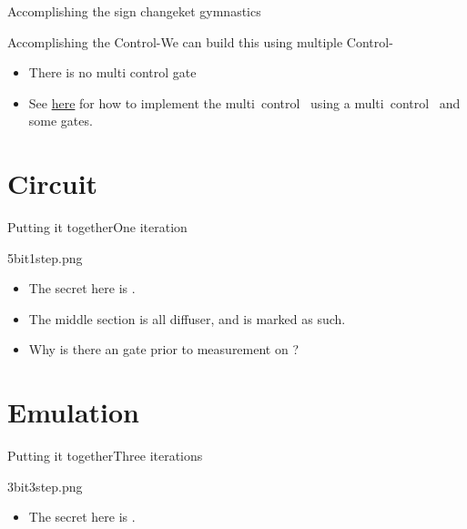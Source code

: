 {\begin{frame}{Accomplishing the sign change}{ket gymnastics}
\end{frame}
\begin{frame}{Accomplishing the Control-\PauliZ}{We can build this using multiple Control-\PauliX{}}

\begin{itemize}
    \item There is no multi control \PauliZ{} gate
    \item 
See \href{https://learn.qiskit.org/course/ch-gates/basic-circuit-identities\#c-from-cnot}{here} for how to implement the multi~control~\PauliZ{} using a multi~control~\PauliX{} and some \Hadamard{} gates.
\end{itemize}
\end{frame}
}

\section*{Circuit}

\begin{frame}{Putting it together}{One iteration}

\Vskip{-4em}\begin{center}
\begin{Pixture}[width=0.97\textwidth]{26}{5bit1step.png}
\end{Pixture}
\end{center}
\begin{itemize}
    \item The secret here is .
    \item The middle section is all diffuser, and is marked as such.
    \item Why is there an \Hadamard{} gate prior to measurement on ?
\end{itemize}
    
\end{frame}

\section*{Emulation}
\begin{frame}{Putting it together}{Three iterations}

\Vskip{-4em}\begin{center}
\begin{Pixture}[width=0.8\textwidth]{26}{3bit3step.png}
\end{Pixture}
\end{center}
\begin{itemize}
    \item The secret here is .
\end{itemize}
    
\end{frame}

